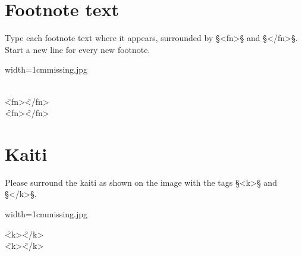 \documentclass[fontsize=11pt, paper=a4, 
  DIV15,
  normalheadings,
  parskip=half-, 
  pointlessnumbers]{scrartcl}
\begin{document}
\section{Footnote text}
\begin{mainrule}
  Type each footnote text where it appears, surrounded by §<fn>§ and
  §</fn>§. Start a new line for every new footnote.
\end{mainrule}
\vspace{3mm}

\begin{sampleImageSmall}[\ 2: \, caption.]{width=1cm}{missing.jpg}
  \begin{typeChinese}
    \\
    \f{<fn>}\f{</fn>}\\
    \f{<fn>}\f{</fn>}
  \end{typeChinese}
\end{sampleImageSmall}

\section{Kaiti}
\begin{mainrule}
  Please surround the kaiti as shown on the image with the tags §<k>§ and §</k>§.
\end{mainrule}
\vspace{3mm}

\begin{sampleImageSmall}[\ 3: \, caption.]{width=1cm}{missing.jpg}
  \begin{typeChinese}
\f{<k>}\f{</k>}\\
\f{<k>}\f{</k>}\\
\\
\\
\\
\\
  \end{typeChinese}
\end{sampleImageSmall}
\end{document}

